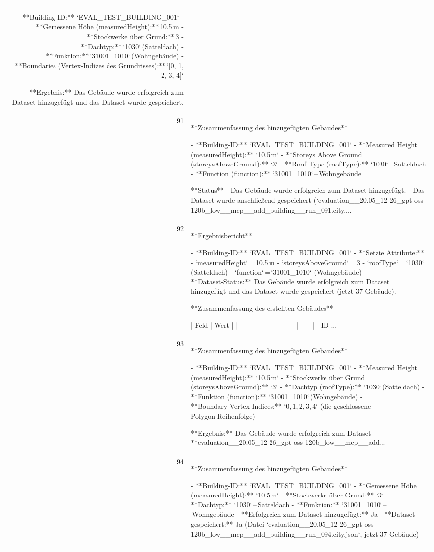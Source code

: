 \documentclass[a4paper,11pt]{article}
\begin{document}
\begin{table}[ht]
\begin{tabular}{r p{12cm}}
- **Building‑ID:** `EVAL\_TEST\_BUILDING\_001`  
- **Gemessene Höhe (measuredHeight):** 10.5 m  
- **Stockwerke über Grund:** 3  
- **Dachtyp:** `1030` (Satteldach)  
- **Funktion:** `31001\_1010` (Wohngebäude)  
- **Boundaries (Vertex‑Indizes des Grundrisses):** `[0, 1, 2, 3, 4]`  

**Ergebnis:** Das Gebäude wurde erfolgreich zum Dataset hinzugefügt und das Dataset wurde gespeichert. \\
91 & **Zusammenfassung des hinzugefügten Gebäudes**

- **Building-ID:** `EVAL\_TEST\_BUILDING\_001`  
- **Measured Height (measuredHeight):** `10.5 m`  
- **Storeys Above Ground (storeysAboveGround):** `3`  
- **Roof Type (roofType):** `1030` – Satteldach  
- **Function (function):** `31001\_1010` – Wohngebäude  

**Status**  
- Das Gebäude wurde erfolgreich zum Dataset hinzugefügt.  
- Das Dataset wurde anschließend gespeichert (`evaluation\_\_20.05\_12-26\_gpt-oss-120b\_low\_\_mcp\_\_add\_building\_\_run\_091.city.... \\
92 & **Ergebnisbericht**

- **Building‑ID:** `EVAL\_TEST\_BUILDING\_001`  
- **Setzte Attribute:**  
  - `measuredHeight` = 10.5 m  
  - `storeysAboveGround` = 3  
  - `roofType` = `1030` (Satteldach)  
  - `function` = `31001\_1010` (Wohngebäude)  
- **Dataset‑Status:** Das Gebäude wurde erfolgreich zum Dataset hinzugefügt und das Dataset wurde gespeichert (jetzt 37 Gebäude).

**Zusammenfassung des erstellten Gebäudes**

| Feld                     | Wert |
|--------------------------|------|
| ID       ... \\
93 & **Zusammenfassung des hinzugefügten Gebäudes**

- **Building-ID:** `EVAL\_TEST\_BUILDING\_001`  
- **Measured Height (measuredHeight):** `10.5 m`  
- **Stockwerke über Grund (storeysAboveGround):** `3`  
- **Dachtyp (roofType):** `1030` (Satteldach)  
- **Funktion (function):** `31001\_1010` (Wohngebäude)  
- **Boundary‑Vertex‑Indices:** `0, 1, 2, 3, 4` (die geschlossene Polygon‑Reihenfolge)

**Ergebnis:** Das Gebäude wurde erfolgreich zum Dataset **evaluation\_\_20.05\_12-26\_gpt-oss-120b\_low\_\_mcp\_\_add... \\
94 & **Zusammenfassung des hinzugefügten Gebäudes**

- **Building-ID:** `EVAL\_TEST\_BUILDING\_001`  
- **Gemessene Höhe (measuredHeight):** `10.5 m`  
- **Stockwerke über Grund:** `3`  
- **Dachtyp:** `1030` – Satteldach  
- **Funktion:** `31001\_1010` – Wohngebäude  
- **Erfolgreich zum Dataset hinzugefügt:** Ja  
- **Dataset gespeichert:** Ja (Datei `evaluation\_\_20.05\_12-26\_gpt-oss-120b\_low\_\_mcp\_\_add\_building\_\_run\_094.city.json`, jetzt 37 Gebäude)  


\end{tabular}
\end{table}
\end{document}
